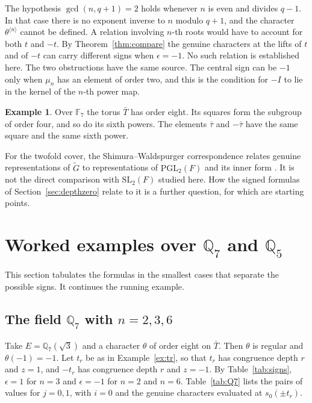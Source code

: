 \documentclass[12pt,letterpaper]{article}
\numberwithin{equation}{section}
\theoremstyle{definition}
\newtheorem{example}[theorem]{Example}
\theoremstyle{remark}
\newcommand{\Gt}{\widetilde G}
\newcommand{\sgn}{\epsilon}
\begin{document}
The hypothesis $\gcd(n,q+1)=2$ holds whenever $n$ is even and divides $q-1$. In that case there is no exponent inverse to $n$ modulo $q+1$, and the character $\theta^{\langle n\rangle}$ cannot be defined. A relation involving $n$-th roots would have to account for both $t$ and $-t$. By Theorem~\ref{thm:compare} the genuine characters at the lifts of $t$ and of $-t$ can carry different signs when $\sgn=-1$. No such relation is established here. The two obstructions have the same source. The central sign can be $-1$ only when $\mu_n$ has an element of order two, and this is the condition for $-I$ to lie in the kernel of the $n$-th power map.

\begin{example}
Over $\mathbb F_7$ the torus $\bar T$ has order eight. Its squares form the subgroup of order four, and so do its sixth powers. The elements $\bar\tau$ and $-\bar\tau$ have the same square and the same sixth power.
\end{example}

For the twofold cover, the Shimura--Waldspurger correspondence relates genuine representations of $\Gt$ to representations of $\mathrm{PGL}_2(F)$ and its inner form \cite{Wa80,Wa91}. It is not the direct comparison with $\mathrm{SL}_2(F)$ studied here. How the signed formulas of Section~\ref{sec:depthzero} relate to it is a further question, for which \cite{Wa91,Ma04} are starting points.

\section{Worked examples over \texorpdfstring{$\mathbb Q_7$ and $\mathbb Q_5$}{Q7 and Q5}}\label{sec:examples}
This section tabulates the formulas in the smallest cases that separate the possible signs. It continues the running example.

\subsection*{The field $\mathbb Q_7$ with $n=2,3,6$}
Take $E=\mathbb Q_7(\sqrt3)$ and a character $\theta$ of order eight on $\bar T$. Then $\theta$ is regular and $\theta(-1)=-1$. Let $t_r$ be as in Example~\ref{ex:tr}, so that $t_r$ has congruence depth $r$ and $z=1$, and $-t_r$ has congruence depth $r$ and $z=-1$. By Table~\ref{tab:signs}, $\sgn=1$ for $n=3$ and $\sgn=-1$ for $n=2$ and $n=6$. Table~\ref{tab:Q7} lists the pairs of values for $j=0,1$, with $i=0$ and the genuine characters evaluated at $s_0(\pm t_r)$.
\end{document}

